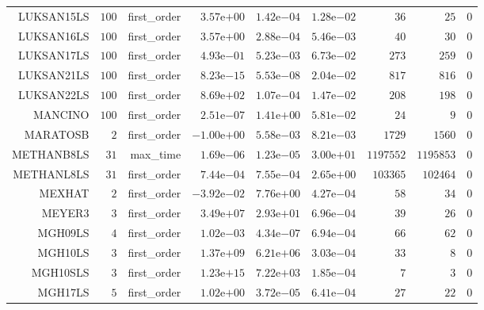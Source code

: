 \begin{longtable}{rrrrrrrrr}
LUKSAN15LS & \(   100\) & first\_order & \( 3.57\)e\(+00\) & \( 1.42\)e\(-04\) & \( 1.28\)e\(-02\) & \(    36\) & \(    25\) & \(     0\) \\
LUKSAN16LS & \(   100\) & first\_order & \( 3.57\)e\(+00\) & \( 2.88\)e\(-04\) & \( 5.46\)e\(-03\) & \(    40\) & \(    30\) & \(     0\) \\
LUKSAN17LS & \(   100\) & first\_order & \( 4.93\)e\(-01\) & \( 5.23\)e\(-03\) & \( 6.73\)e\(-02\) & \(   273\) & \(   259\) & \(     0\) \\
LUKSAN21LS & \(   100\) & first\_order & \( 8.23\)e\(-15\) & \( 5.53\)e\(-08\) & \( 2.04\)e\(-02\) & \(   817\) & \(   816\) & \(     0\) \\
LUKSAN22LS & \(   100\) & first\_order & \( 8.69\)e\(+02\) & \( 1.07\)e\(-04\) & \( 1.47\)e\(-02\) & \(   208\) & \(   198\) & \(     0\) \\
MANCINO & \(   100\) & first\_order & \( 2.51\)e\(-07\) & \( 1.41\)e\(+00\) & \( 5.81\)e\(-02\) & \(    24\) & \(     9\) & \(     0\) \\
MARATOSB & \(     2\) & first\_order & \(-1.00\)e\(+00\) & \( 5.58\)e\(-03\) & \( 8.21\)e\(-03\) & \(  1729\) & \(  1560\) & \(     0\) \\
METHANB8LS & \(    31\) & max\_time & \( 1.69\)e\(-06\) & \( 1.23\)e\(-05\) & \( 3.00\)e\(+01\) & \(1197552\) & \(1195853\) & \(     0\) \\
METHANL8LS & \(    31\) & first\_order & \( 7.44\)e\(-04\) & \( 7.55\)e\(-04\) & \( 2.65\)e\(+00\) & \(103365\) & \(102464\) & \(     0\) \\
MEXHAT & \(     2\) & first\_order & \(-3.92\)e\(-02\) & \( 7.76\)e\(+00\) & \( 4.27\)e\(-04\) & \(    58\) & \(    34\) & \(     0\) \\
MEYER3 & \(     3\) & first\_order & \( 3.49\)e\(+07\) & \( 2.93\)e\(+01\) & \( 6.96\)e\(-04\) & \(    39\) & \(    26\) & \(     0\) \\
MGH09LS & \(     4\) & first\_order & \( 1.02\)e\(-03\) & \( 4.34\)e\(-07\) & \( 6.94\)e\(-04\) & \(    66\) & \(    62\) & \(     0\) \\
MGH10LS & \(     3\) & first\_order & \( 1.37\)e\(+09\) & \( 6.21\)e\(+06\) & \( 3.03\)e\(-04\) & \(    33\) & \(     8\) & \(     0\) \\
MGH10SLS & \(     3\) & first\_order & \( 1.23\)e\(+15\) & \( 7.22\)e\(+03\) & \( 1.85\)e\(-04\) & \(     7\) & \(     3\) & \(     0\) \\
MGH17LS & \(     5\) & first\_order & \( 1.02\)e\(+00\) & \( 3.72\)e\(-05\) & \( 6.41\)e\(-04\) & \(    27\) & \(    22\) & \(     0\) \\

\end{longtable}
